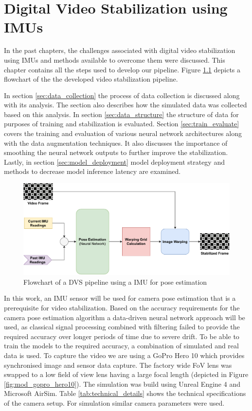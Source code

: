 \chapter{Digital Video Stabilization using IMUs} \label{chapter_four}

In the past chapters, the challenges associated with digital video stabilization using IMUs and methods available to overcome them were discussed. This chapter contains all the steps used to develop our pipeline. Figure \ref{fig:dis_pipeline} depicts a flowchart of the the developed video stabilization pipeline. 

In section \ref{sec:data_collection} the process of data collection is discussed along with its analysis. The section also describes how the simulated data was collected based on this analysis. In section \ref{sec:data_structure} the structure of data for purposes of training and stabilization is evaluated. Section \ref{sec:train_evaluate} covers the training and evaluation of various neural network architectures along with the data augmentation techniques. It also discusses the importance of smoothing the neural network outputs to further improve the stabilization. Lastly, in section \ref{sec:model_deployment} model deployment strategy and methods to decrease model inference latency are examined.

\begin{figure}[H]
    \includegraphics[scale=0.64]{images/fig_chapter4/dis_pipleline.pdf}
    \caption{Flowchart of a DVS pipeline using a IMU for pose estimation}
    \label{fig:dis_pipeline}
\end{figure}


In this work, an IMU sensor will be used for camera pose estimation that is a prerequisite for video stabilization. Based on the accuracy requirements for the camera pose estimation algorithm a data-driven neural network approach will be used, as classical signal processing combined with filtering failed to provide the required accuracy over longer periods of time due to severe drift. To be able to train the models to the required accuracy, a combination of simulated and real data is used. To capture the video we are using a GoPro Hero 10 which provides synchronised image and sensor data capture. The factory wide FoV lens was swapped to a low field of view lens having a large focal length (depicted in Figure \ref{fig:mod_gopro_hero10}). The simulation was build using Unreal Engine 4 and Microsoft AirSim. Table \ref{tab:technical_details} shows the technical specifications of the camera setup. For simulation similar camera parameters were used.

